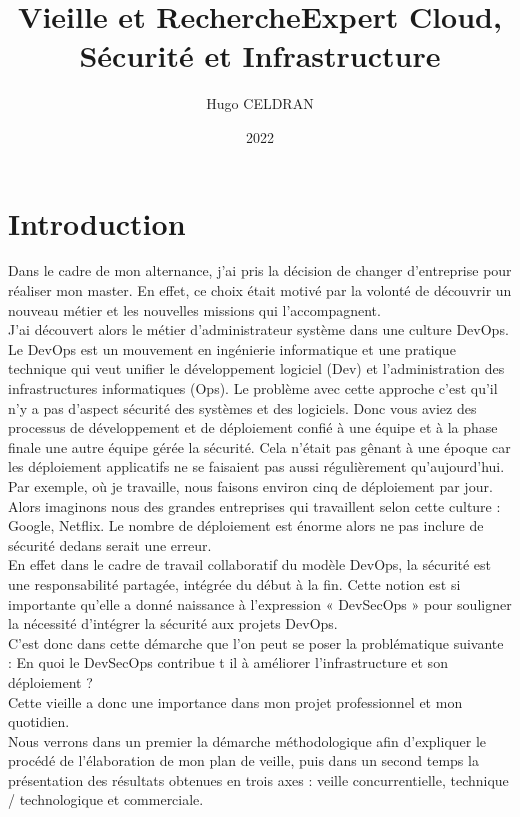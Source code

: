 \documentclass[11pt,a4paper,oneside]{book}
\author{Hugo CELDRAN}
\title{Vieille et Recherche}
\title{Expert Cloud, Sécurité et Infrastructure}
\date{2022}
\begin{document}
\maketitle
\tableofcontents


\chapter{Introduction}

Dans le cadre de mon alternance, j'ai pris la décision de changer d'entreprise pour réaliser mon master.
En effet, ce choix était motivé par la volonté de découvrir un nouveau métier et les nouvelles missions qui l'accompagnent. \\
J'ai découvert alors le métier d'administrateur système dans une culture DevOps.
Le DevOps est un mouvement en ingénierie informatique et une pratique technique qui veut unifier le développement logiciel (Dev) et l'administration des infrastructures informatiques (Ops).
Le problème avec cette approche c'est qu'il n'y a pas d'aspect sécurité des systèmes et des logiciels.
Donc vous aviez des processus de développement et de déploiement confié à une équipe et à la phase finale une autre équipe gérée la sécurité.
Cela n'était pas gênant à une époque car les déploiement applicatifs ne se faisaient pas aussi régulièrement qu'aujourd'hui.
Par exemple, où je travaille, nous faisons environ cinq de déploiement par jour. Alors imaginons nous des grandes entreprises qui travaillent selon cette culture : Google, Netflix. Le nombre de déploiement est énorme alors ne pas inclure de sécurité dedans serait une erreur. \\
En effet dans le cadre de travail collaboratif du modèle DevOps, la sécurité est une responsabilité partagée, intégrée du début à la fin. Cette notion est si importante qu'elle a donné naissance à l'expression « DevSecOps » pour souligner la nécessité d'intégrer la sécurité aux projets DevOps. \\
C'est donc dans cette démarche que l'on peut se poser la problématique suivante : En quoi le DevSecOps contribue t il à améliorer l'infrastructure et son déploiement ? \\
Cette vieille a donc une importance dans mon projet professionnel et mon quotidien. \\
Nous verrons dans un premier la démarche méthodologique afin d'expliquer le procédé de l'élaboration de mon plan de veille, puis dans un second temps la présentation des résultats obtenues en trois axes : veille concurrentielle, technique / technologique et commerciale.
\end{document}
